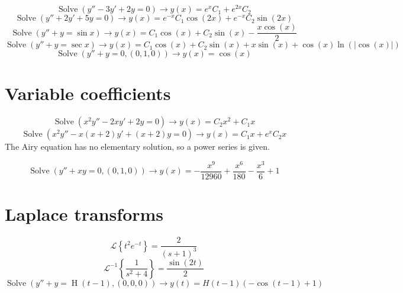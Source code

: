 \documentclass[11pt,a4paper]{article}
\theoremstyle{plain}
\theoremstyle{definition}
\theoremstyle{remark}
\begin{document}
\begin{equation*}
  \operatorname{Solve}(y'' - 3y' + 2y = 0) \to y\left(x\right) = e^{x} C_{1} + e^{2 x} C_{2}
\end{equation*}
\begin{equation*}
  \operatorname{Solve}(y'' + 2y' + 5y = 0) \to y\left(x\right) = e^{-x} C_{1} \cos\left(2 x\right) + e^{-x} C_{2} \sin\left(2 x\right)
\end{equation*}
\begin{equation*}
  \operatorname{Solve}(y'' + y = \sin x) \to y\left(x\right) = C_{1} \cos\left(x\right) + C_{2} \sin\left(x\right) - \frac{x \cos\left(x\right)}{2}
\end{equation*}
\begin{equation*}
  \operatorname{Solve}(y'' + y = \sec x) \to y\left(x\right) = C_{1} \cos\left(x\right) + C_{2} \sin\left(x\right) + x \sin\left(x\right) + \cos\left(x\right) \ln\left(\left|\cos\left(x\right)\right|\right)
\end{equation*}
\begin{equation*}
  \operatorname{Solve}(y'' + y = 0, (0, 1, 0)) \to y\left(x\right) = \cos\left(x\right)
\end{equation*}
\section*{Variable coefficients}

\begin{equation*}
  \operatorname{Solve}(x^2 y'' - 2x y' + 2y = 0) \to y\left(x\right) = C_{2} x^{2} + C_{1} x
\end{equation*}
\begin{equation*}
  \operatorname{Solve}(x^2 y'' - x (x + 2) y' + (x + 2) y = 0) \to y\left(x\right) = C_{1} x + e^{x} C_{2} x
\end{equation*}
The Airy equation has no elementary solution, so a power series is given.

\begin{equation*}
  \operatorname{Solve}(y'' + x y = 0, (0, 1, 0)) \to y\left(x\right) = -\frac{x^{9}}{12960} + \frac{x^{6}}{180} - \frac{x^{3}}{6} + 1
\end{equation*}
\section*{Laplace transforms}

\begin{equation*}
  \mathcal{L}\left\{ t^2 e^{-t} \right\} = \frac{2}{\left(s + 1\right)^{3}}
\end{equation*}
\begin{equation*}
  \mathcal{L}^{-1}\left\{ \frac{1}{s^2 + 4} \right\} = \frac{\sin\left(2 t\right)}{2}
\end{equation*}
\begin{equation*}
  \operatorname{Solve}(y'' + y = \operatorname{H}(t - 1), (0, 0, 0)) \to y\left(t\right) = H\left(t - 1\right) \left(-\cos\left(t - 1\right) + 1\right)
\end{equation*}
\end{document}

